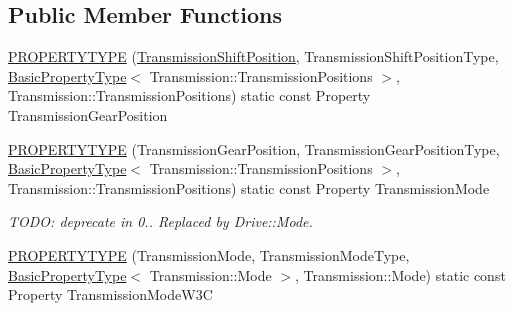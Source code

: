 \subsection*{Public Member Functions}
\begin{DoxyCompactItemize}
\item 
\hyperlink{classVehicleProperty_a768a0be8079ce3e1645cdc259a84adf7}{P\-R\-O\-P\-E\-R\-T\-Y\-T\-Y\-P\-E} (\hyperlink{classVehicleProperty_ae486d9ea26918460822086b797018800}{Transmission\-Shift\-Position}, Transmission\-Shift\-Position\-Type, \hyperlink{classBasicPropertyType}{Basic\-Property\-Type}$<$ Transmission\-::\-Transmission\-Positions $>$, Transmission\-::\-Transmission\-Positions) static const Property Transmission\-Gear\-Position
\item 
\hypertarget{classVehicleProperty_af9df28b1bc1bef05442b6b1cce40c80e}{\hyperlink{classVehicleProperty_af9df28b1bc1bef05442b6b1cce40c80e}{P\-R\-O\-P\-E\-R\-T\-Y\-T\-Y\-P\-E} (Transmission\-Gear\-Position, Transmission\-Gear\-Position\-Type, \hyperlink{classBasicPropertyType}{Basic\-Property\-Type}$<$ Transmission\-::\-Transmission\-Positions $>$, Transmission\-::\-Transmission\-Positions) static const Property Transmission\-Mode}\label{classVehicleProperty_af9df28b1bc1bef05442b6b1cce40c80e}

\begin{DoxyCompactList}\small\item\em T\-O\-D\-O\-: deprecate in 0.. Replaced by Drive\-::\-Mode. \end{DoxyCompactList}\item 
\hyperlink{classVehicleProperty_ab54cbac952e0414507dfd9afa8e11b13}{P\-R\-O\-P\-E\-R\-T\-Y\-T\-Y\-P\-E} (Transmission\-Mode, Transmission\-Mode\-Type, \hyperlink{classBasicPropertyType}{Basic\-Property\-Type}$<$ Transmission\-::\-Mode $>$, Transmission\-::\-Mode) static const Property Transmission\-Mode\-W3\-C
\end{DoxyCompactItemize}
